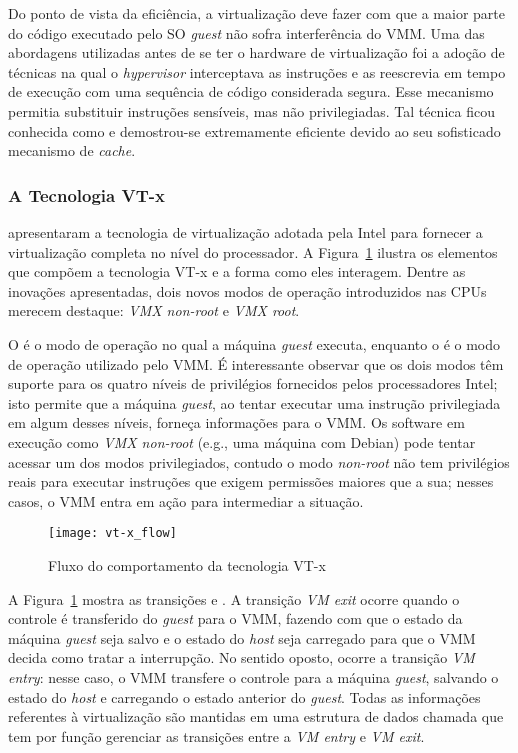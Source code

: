 Do ponto de vista da eficiência, a virtualização deve fazer com que a maior
parte do código executado pelo SO \emph{guest} não sofra interferência do VMM.
Uma das abordagens utilizadas antes de se ter o hardware de virtualização foi a
adoção de técnicas na qual o \textit{hypervisor} interceptava as instruções e
as reescrevia em tempo de execução com uma sequência de código considerada
segura. Esse mecanismo permitia substituir instruções sensíveis, mas não
privilegiadas. Tal técnica ficou conhecida como 
e demostrou-se extremamente eficiente devido ao seu sofisticado mecanismo de
\emph{cache}.


\subsubsection{A Tecnologia VT-x}
\label{sec:vtx}

\cite{uhlig} apresentaram a tecnologia de virtualização adotada pela Intel para
fornecer a virtualização completa no nível do processador. A
Figura~\ref{fig:vt-x_flow} ilustra os elementos que compõem a tecnologia VT-x e a
forma como eles interagem. Dentre as inovações apresentadas, dois novos modos
de operação introduzidos nas CPUs merecem destaque: \emph{VMX non-root} e
\emph{VMX root}.

O  é o modo de operação no qual a máquina
\emph{guest} executa, enquanto o  é o modo de operação utilizado
pelo VMM. É interessante observar que os dois modos têm suporte para os quatro
níveis de privilégios fornecidos pelos processadores Intel; isto permite que a
máquina \emph{guest}, ao tentar executar uma instrução privilegiada em algum
desses níveis, forneça informações para o VMM. Os software em execução como
\emph{VMX non-root} (e.g., uma máquina com Debian) pode tentar acessar um dos
modos privilegiados, contudo o modo \emph{non-root} não tem privilégios reais
para executar instruções que exigem permissões maiores que a sua; nesses casos,
o VMM entra em ação para intermediar a situação.

\begin{figure}[!h]
  \centering
  \texttt{[image: vt-x\_flow]} 
  \caption{Fluxo do comportamento da tecnologia VT-x}
  \label{fig:vt-x_flow}
\end{figure}

A Figura~\ref{fig:vt-x_flow} mostra as transições  e
. A transição \emph{VM exit} ocorre quando o controle é
transferido do \emph{guest} para o VMM, fazendo com que o estado da máquina
\emph{guest} seja salvo e o estado do \emph{host} seja carregado para que o VMM
decida como tratar a interrupção. No sentido oposto, ocorre a transição
\emph{VM entry}: nesse caso, o VMM transfere o controle para a máquina
\emph{guest}, salvando o estado do \emph{host} e carregando o estado
anterior do \emph{guest}. Todas as informações referentes à virtualização são
mantidas em uma estrutura de dados chamada  que tem por função gerenciar as transições entre a
\emph{VM entry} e \emph{VM exit}.
